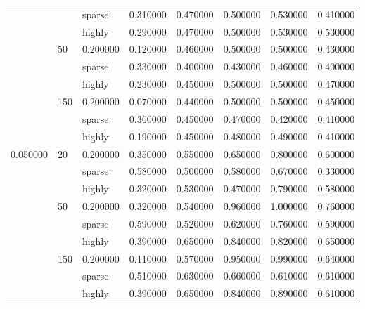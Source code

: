 \begin{tabular}{lllrrrrr}
 &  & sparse & 0.310000 & 0.470000 & 0.500000 & 0.530000 & 0.410000 \\
 &  & highly & 0.290000 & 0.470000 & 0.500000 & 0.530000 & 0.530000 \\
\cline{2-8}
 & \multirow[t]{3}{*}{50} & 0.200000 & 0.120000 & 0.460000 & 0.500000 & 0.500000 & 0.430000 \\
 &  & sparse & 0.330000 & 0.400000 & 0.430000 & 0.460000 & 0.400000 \\
 &  & highly & 0.230000 & 0.450000 & 0.500000 & 0.500000 & 0.470000 \\
\cline{2-8}
 & \multirow[t]{3}{*}{150} & 0.200000 & 0.070000 & 0.440000 & 0.500000 & 0.500000 & 0.450000 \\
 &  & sparse & 0.360000 & 0.450000 & 0.470000 & 0.420000 & 0.410000 \\
 &  & highly & 0.190000 & 0.450000 & 0.480000 & 0.490000 & 0.410000 \\
\cline{1-8} \cline{2-8}
\multirow[t]{9}{*}{0.050000} & \multirow[t]{3}{*}{20} & 0.200000 & 0.350000 & 0.550000 & 0.650000 & 0.800000 & 0.600000 \\
 &  & sparse & 0.580000 & 0.500000 & 0.580000 & 0.670000 & 0.330000 \\
 &  & highly & 0.320000 & 0.530000 & 0.470000 & 0.790000 & 0.580000 \\
\cline{2-8}
 & \multirow[t]{3}{*}{50} & 0.200000 & 0.320000 & 0.540000 & 0.960000 & 1.000000 & 0.760000 \\
 &  & sparse & 0.590000 & 0.520000 & 0.620000 & 0.760000 & 0.590000 \\
 &  & highly & 0.390000 & 0.650000 & 0.840000 & 0.820000 & 0.650000 \\
\cline{2-8}
 & \multirow[t]{3}{*}{150} & 0.200000 & 0.110000 & 0.570000 & 0.950000 & 0.990000 & 0.640000 \\
 &  & sparse & 0.510000 & 0.630000 & 0.660000 & 0.610000 & 0.610000 \\
 &  & highly & 0.390000 & 0.650000 & 0.840000 & 0.890000 & 0.610000 \\
\cline{1-8} \cline{2-8}
\bottomrule
\end{tabular}
